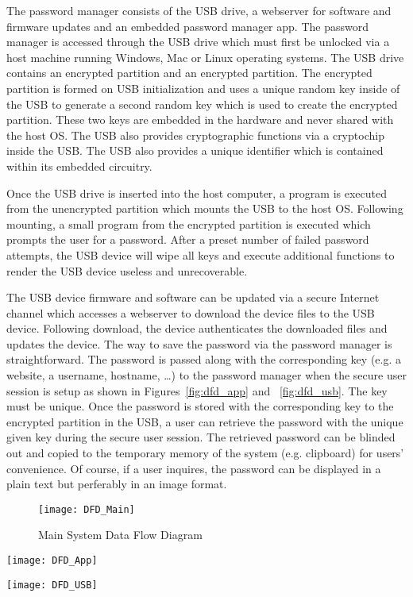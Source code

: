 The password manager consists of the USB drive, a webserver for software and
firmware updates and an embedded password manager app.  The password manager is
accessed through the USB drive which must first be unlocked via a host machine
running Windows, Mac or Linux operating systems. The USB drive contains an
encrypted partition and an encrypted partition.  The encrypted partition is
formed on USB initialization and uses a unique random key inside of the USB to
generate a second random key which is used to create the encrypted
partition. These two keys are embedded in the hardware and never shared with the
host OS.  The USB also
provides cryptographic functions via a cryptochip inside the USB.  The USB also
provides a unique identifier which is contained within its embedded circuitry.
\par Once the USB drive is inserted into the host computer, a program is
executed from the unencrypted partition which mounts the USB to the host OS.
Following mounting, a small program from the encrypted partition is executed
which prompts the user for a password. After a preset number of failed password
attempts, the USB device will wipe all keys and execute additional functions to
render the USB device useless and unrecoverable.
\par The USB device firmware and software can be updated via a secure Internet
channel which accesses a webserver to download the device files to the USB
device.  Following download, the device authenticates the downloaded files and
updates the device.
The way to save the password via the password manager is straightforward. The
password is passed along with the corresponding key (e.g. a website, a username,
hostname, \dots) to the password manager when the secure user session is
setup as shown in Figures~\ref{fig:dfd_app} and ~\ref{fig:dfd_usb}. The key
must be unique. Once
the password is stored with the corresponding key to the encrypted partition in
the USB, a user can retrieve the password with the unique given key during the
secure user session. The retrieved password can be blinded out and copied to the
temporary memory of the system (e.g. clipboard) for users' convenience. Of
course, if a user inquires, the password can be displayed in a plain text but
perferably in an image format.

\begin{figure}
    \centering
    \texttt{[image: DFD\_Main]}
    \caption{Main System Data Flow Diagram}
    \label{fig:dfd_main}
\end{figure}
\begin{figure*}
    \centering
    \texttt{[image: DFD\_App]}
    \caption{System Data Flow Diagram in the App side}
    \label{fig:dfd_app}
\end{figure*}
\begin{figure*}
    \centering
    \texttt{[image: DFD\_USB]}
    \caption{System Data Flow Diagram in the USB side}
    \label{fig:dfd_usb}
\end{figure*}

